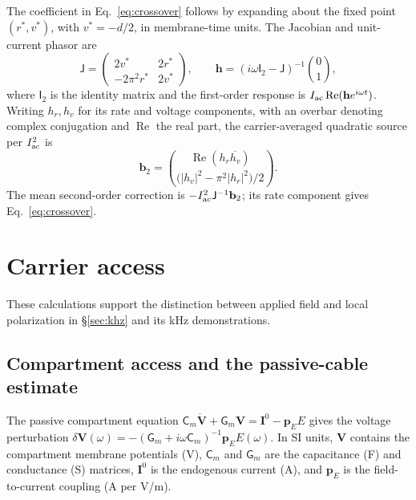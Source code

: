 \documentclass[11pt,a4paper]{article}
\newif\ifappendices
\begin{document}
The coefficient in Eq.~\eqref{eq:crossover} follows by expanding about the
fixed point $(r^*,v^*)$, with $v^*=-d/2$, in membrane-time units.
The Jacobian and unit-current phasor are
\[
\mathsf J=\begin{pmatrix}2v^*&2r^*\\-2\pi^2r^*&2v^*\end{pmatrix},\qquad
\mathbf h=(i\omega\mathsf I_2-\mathsf J)^{-1}\binom{0}{1},
\]
where $\mathsf I_2$ is the identity matrix and the first-order response is
$I_{\rm ac}\operatorname{Re}(\mathbf h e^{i\omega t})$.
Writing $h_r,h_v$ for its rate and voltage components, with an overbar denoting
complex conjugation and $\operatorname{Re}$ the real part, the carrier-averaged
quadratic source per $I_{\rm ac}^2$ is
\[
\mathbf b_2=\binom{\operatorname{Re}(h_r\overline{h_v})}{\big(|h_v|^2-\pi^2|h_r|^2\big)/2}.
\]
The mean second-order correction is $-I_{\rm ac}^2\mathsf J^{-1}\mathbf b_2$;
its rate component gives Eq.~\eqref{eq:crossover}.

\fi

\ifappendices
\renewcommand{\thesection}{S\arabic{section}}
\renewcommand{\theHsection}{supp.\arabic{section}}
\setcounter{section}{0}
\renewcommand{\theequation}{S\arabic{equation}}
\renewcommand{\theHequation}{supp.\arabic{equation}}
\setcounter{equation}{0}
\renewcommand{\thefigure}{S\arabic{figure}}
\renewcommand{\theHfigure}{supp.\arabic{figure}}
\setcounter{figure}{0}
\renewcommand{\thetable}{S\arabic{table}}
\renewcommand{\theHtable}{supp.\arabic{table}}
\setcounter{table}{0}
\section{Carrier access}\label{supp:access}
These calculations support the distinction between applied field and local
polarization in \S\ref{sec:khz} and its kHz demonstrations.
\subsection{Compartment access and the passive-cable estimate}\label{app:access}
The passive compartment equation $\mathsf C_m\dot{\mathbf V}+\mathsf G_m\mathbf V=\mathbf I^0-\mathbf p_EE$
\cite{ruffini2021nmm2} gives the voltage perturbation
$\delta\mathbf V(\omega)=-(\mathsf G_m+i\omega\mathsf C_m)^{-1}\mathbf p_EE(\omega)$. In SI units, $\mathbf V$ contains the compartment membrane potentials (V), $\mathsf C_m$ and
$\mathsf G_m$ are the capacitance (F) and conductance (S) matrices, $\mathbf I^0$ is the
endogenous current (A), and $\mathbf p_E$ is the field-to-current coupling
(A per V/m).
\end{document}
